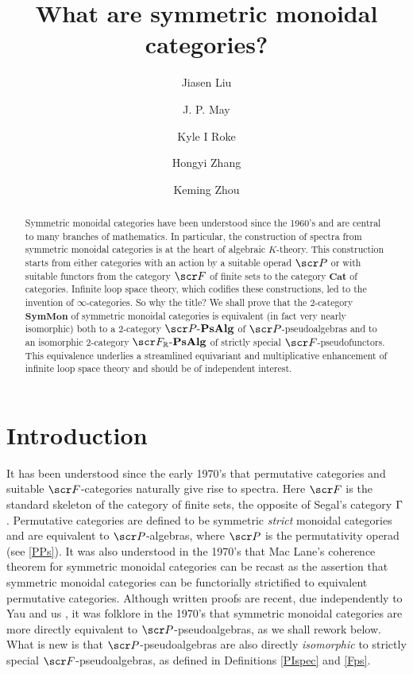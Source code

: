 \documentclass{amsart}
\title{What are symmetric monoidal categories?}
\author{Jiasen Liu}
\author{J. P. May}
\author{Kyle I Roke}
\author{Hongyi Zhang}
\author{Keming Zhou}
\theoremstyle{definition}
\numberwithin{equation}{section}
\newcommand{\PPs}{\sP\text{-}\mathbf{PsAlg}}
\newcommand{\FPR}{\sF_{\bR}\text{-}\mathbf{PsAlg}}
\newcommand{\SM}{\mathbf{SymMon}}
\begin{document}
\begin{abstract} 
Symmetric monoidal categories have been understood since the 1960's and are central to many branches of mathematics.  In particular, the construction of spectra from symmetric monoidal categories is at the heart of algebraic $K$-theory.  This construction starts from either categories with an action by a suitable operad $\sP$ or with suitable functors from the category  
$\sF$ of finite sets to the category $\mathbf{Cat}$ of categories.  Infinite loop space theory, which codifies these constructions, led to the invention of $\infty$-categories.  So why the title?  We shall prove that the $2$-category $\SM$ of symmetric monoidal categories is equivalent (in fact very nearly isomorphic) both to a $2$-category $\PPs$ of $\sP$-pseudoalgebras and to an isomorphic $2$-category $\FPR$ of strictly special $\sF$-pseudofunctors.   This equivalence underlies a streamlined equivariant and multiplicative enhancement of infinite loop space theory and should be of independent interest.
\end{abstract}

\maketitle

\tableofcontents

\section*{Introduction} It has been understood since the early 1970's that permutative categories and suitable $\sF$-categories naturally give rise to spectra.  Here $\sF$  is the standard skeleton of the category of finite sets, the opposite of Segal's category $\Gamma$ \cite{MayPerm, Seg}.  Permutative categories are defined to be symmetric {\em strict} monoidal categories and are equivalent to $\sP$-algebras, where $\sP$ is the permutativity operad (see \autoref{PPs}).   It was also understood in the 1970's that Mac Lane's coherence theorem \cite{Mac}  for symmetric monoidal categories can be recast as the assertion that symmetric monoidal categories can be functorially strictified to equivalent permutative categories.  Although written proofs are recent, due independently to Yau \cite{Yau2} and us \cite{LRZZ}, it was folklore in the 1970's that symmetric monoidal categories are more directly equivalent to $\sP$-pseudoalgebras, as we shall rework below.   What is new is that $\sP$-pseudoalgebras are also directly {\em{ isomorphic}} to strictly special $\sF$-pseudoalgebras, as defined in  Definitions \ref{PIspec} and  \ref{Fps}.
\end{document}

